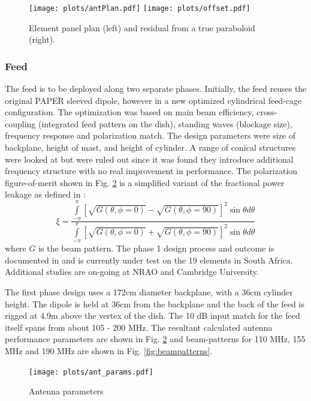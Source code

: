 \documentclass[preprint,11pt]{aastex}
\newcommand{\integral}{\int\limits}
\begin{document}
\begin{figure}[h!]
\centerline{
\texttt{[image: plots/antPlan.pdf]}
\texttt{[image: plots/offset.pdf]} 
}
\caption{\small Element panel plan (left) and residual from a true paraboloid (right).
\label{fig:elementplan}}
\end{figure}

\subsubsection{Feed}
The feed is to be deployed along two separate phases.  Initially, the feed reuses the original PAPER sleeved dipole, however in a new optimized cylindrical feed-cage configuration.  The optimization was based on main beam efficiency, cross-coupling (integrated feed pattern on the dish), standing waves (blockage size), frequency response and polarization match.  The design parameters were size of backplane, height of mast, and height of cylinder.  A range of conical structures were looked at but were ruled out since it was found they introduce additional frequency structure with no real improvement in performance.  The polarization figure-of-merit shown in Fig. \ref{fig:ant_params} is a simplified variant of the fractional power leakage as defined in \cite{Moore_et_al2015}:
\begin{equation}
\xi = \frac{\integral_{-\pi}^{\pi}\left[\sqrt{G(\theta,\phi=0)} - \sqrt{G(\theta,\phi=90)}\right]^2\sin\theta d\theta}
               {\integral_{-\pi}^{\pi}\left[\sqrt{G(\theta,\phi=0)} + \sqrt{G(\theta,\phi=90)}\right]^2\sin\theta d\theta}
\end{equation}
where $G$ is the beam pattern.
The phase 1 design process and outcome is documented in  \cite{feedmemo} and is currently under test on the 19 elements in South Africa. Additional studies are on-going at NRAO and Cambridge University.

The first phase design uses a 172cm diameter backplane, with a 36cm cylinder height.  The dipole is held at 36cm from the backplane and the back of the feed is rigged at 4.9m above the vertex of the dish.  The 10 dB input match for the feed itself spans from about 105 - 200 MHz.  The resultant calculated antenna performance parameters are shown in Fig. \ref{fig:ant_params} and beam-patterns for 110 MHz, 155 MHz and 190 MHz are shown in Fig. \ref{fig:beampatterns}.

\begin{figure}[h!]
\centerline{
\texttt{[image: plots/ant\_params.pdf]}
}
\caption{\small Antenna parameters}
\label{fig:ant_params}
\end{figure}
\end{document}
